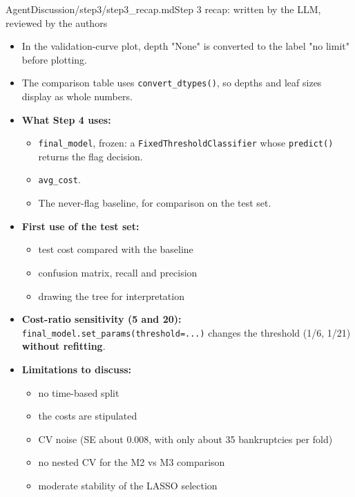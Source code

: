 \begin{mdfile}{AgentDiscussion/\allowbreak{}step3/\allowbreak{}step3\_recap.md}{Step 3 recap: written by the LLM, reviewed by the authors}
\begin{enumerate}
  \begin{itemize}
  \tightlist
  \item
    In the validation-curve plot, depth "None" is converted to the label "no limit" before plotting.
  \item
    The comparison table uses \texttt{convert\_dtypes()}, so depths and leaf sizes display as whole numbers.
  \end{itemize}
\end{enumerate}


\begin{itemize}
\tightlist
\item
  \textbf{What Step 4 uses:}

  \begin{itemize}
  \tightlist
  \item
    \texttt{final\_model}, frozen: a \texttt{FixedThresholdClassifier} whose \texttt{predict()} returns the flag decision.
  \item
    \texttt{avg\_cost}.
  \item
    The never-flag baseline, for comparison on the test set.
  \end{itemize}
\item
  \textbf{First use of the test set:}

  \begin{itemize}
  \tightlist
  \item
    test cost compared with the baseline
  \item
    confusion matrix, recall and precision
  \item
    drawing the tree for interpretation
  \end{itemize}
\item
  \textbf{Cost-ratio sensitivity (5 and 20):} \texttt{final\_model.set\_params(threshold=...)} changes the threshold (1/6, 1/21) \textbf{without refitting}.
\item
  \textbf{Limitations to discuss:}

  \begin{itemize}
  \tightlist
  \item
    no time-based split
  \item
    the costs are stipulated
  \item
    CV noise (SE about 0.008, with only about 35 bankruptcies per fold)
  \item
    no nested CV for the M2 vs M3 comparison
  \item
    moderate stability of the LASSO selection
  \end{itemize}
\end{itemize}
\end{mdfile}

